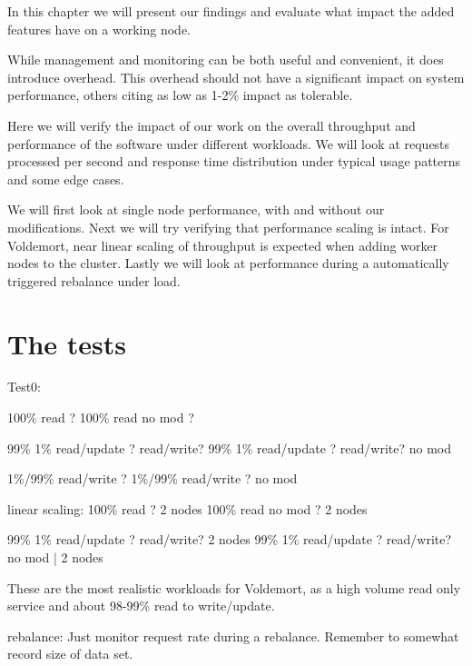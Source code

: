 
In this chapter we will present our findings and evaluate what impact the added features have on a working node.

While management and monitoring can be both useful and convenient, it does introduce overhead. This overhead should not have a significant impact on system performance, others citing as low as 1-2\% impact as tolerable.

Here we will verify the impact of our work on the overall throughput and performance of the software under different workloads. We will look at requests processed per second and response time distribution under typical usage patterns and some edge cases. 

We will first look at single node performance, with and without our modifications.
Next we will try verifying that performance scaling is intact. For Voldemort, near linear scaling of throughput is expected when adding worker nodes to the cluster.
Lastly we will look at performance during a automatically triggered rebalance under load.

\section{The tests}

Test0:

100\% read ?
100\% read no mod ?

99\% 1\% read/update ? read/write?
99\% 1\% read/update ? read/write? no mod

1\%/99\% read/write ?
1\%/99\% read/write ? no mod

linear scaling:
100\% read ? 2 nodes
100\% read no mod ? 2 nodes

99\% 1\% read/update ? read/write? 2 nodes
99\% 1\% read/update ? read/write? no mod | 2 nodes

These are the most realistic workloads for Voldemort, as a high volume read only service and about 98-99\% read to write/update.

rebalance:
Just monitor request rate during a rebalance.
Remember to somewhat record size of data set.

